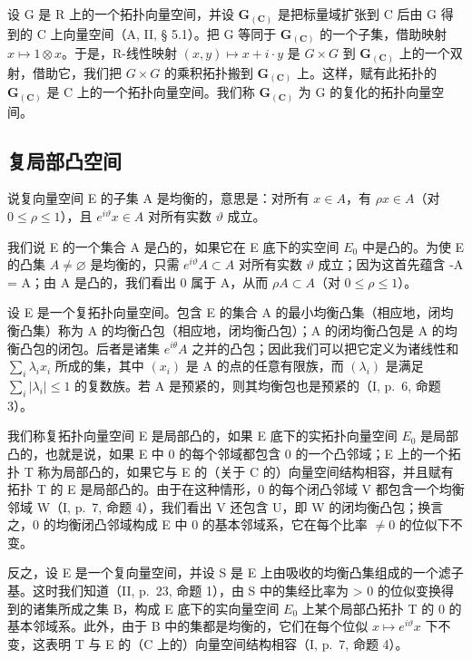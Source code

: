 设 G 是 R 上的一个拓扑向量空间，并设 \(\mathbf{G}_{(\mathbf{C})}\) 是把标量域扩张到 C 后由 G 得到的 C 上向量空间（A, II, § 5.1）。把 G 等同于 \(\mathbf{G}_{(\mathbf{C})}\) 的一个子集，借助映射 \(x \mapsto 1 \otimes x\)。于是，R-线性映射 \((x, y) \mapsto x + i \cdot y\) 是 \(G \times G\) 到 \(\mathbf{G}_{(\mathbf{C})}\) 上的一个双射，借助它，我们把 \(G \times G\) 的乘积拓扑搬到 \(\mathbf{G}_{(\mathbf{C})}\) 上。这样，赋有此拓扑的 \(\mathbf{G}_{(\mathbf{C})}\) 是 C 上的一个拓扑向量空间。我们称 \(\mathbf{G}_{(\mathbf{C})}\) 为 G 的复化的拓扑向量空间。

\subsection{复局部凸空间}

说复向量空间 E 的子集 A 是均衡的，意思是：对所有 \(x \in A\)，有 \(\rho x \in A\)（对 \(0 \leqslant \rho \leqslant 1\)），且 \(e^{i\vartheta}x \in A\) 对所有实数 \(\vartheta\) 成立。

我们说 E 的一个集合 A 是凸的，如果它在 E 底下的实空间 \(E_{0}\) 中是凸的。为使 E 的凸集 \(A \neq \varnothing\) 是均衡的，只需 \(e^{i\vartheta}A \subset A\) 对所有实数 \(\vartheta\) 成立；因为这首先蕴含 -A = A；由 A 是凸的，我们看出 0 属于 A，从而 \(\rho A \subset A\)（对 \(0 \leqslant \rho \leqslant 1\)）。

设 E 是一个复拓扑向量空间。包含 E 的集合 A 的最小均衡凸集（相应地，闭均衡凸集）称为 A 的均衡凸包（相应地，闭均衡凸包）；A 的闭均衡凸包是 A 的均衡凸包的闭包。后者是诸集 \(e^{i\theta}A\) 之并的凸包；因此我们可以把它定义为诸线性和 \(\sum_{i}\lambda_{i}x_{i}\) 所成的集，其中 \((x_{i})\) 是 A 的点的任意有限族，而 \((\lambda_{i})\) 是满足 \(\sum_{i}|\lambda_{i}| \leqslant 1\) 的复数族。若 A 是预紧的，则其均衡包也是预紧的（I, p.~6, 命题 3）。

我们称复拓扑向量空间 E 是局部凸的，如果 E 底下的实拓扑向量空间 \(E_{0}\) 是局部凸的，也就是说，如果 E 中 0 的每个邻域都包含 0 的一个凸邻域；E 上的一个拓扑 T 称为局部凸的，如果它与 E 的（关于 C 的）向量空间结构相容，并且赋有拓扑 T 的 E 是局部凸的。由于在这种情形，0 的每个闭凸邻域 V 都包含一个均衡邻域 W（I, p.~7, 命题 4），我们看出 V 还包含 U，即 W 的闭均衡凸包；换言之，0 的均衡闭凸邻域构成 E 中 0 的基本邻域系，它在每个比率 \(\neq 0\) 的位似下不变。

反之，设 E 是一个复向量空间，并设 S 是 E 上由吸收的均衡凸集组成的一个滤子基。这时我们知道（II, p.~23, 命题 1），由 S 中的集经比率为 \textgreater{} 0 的位似变换得到的诸集所成之集 B，构成 E 底下的实向量空间 \(E_{0}\) 上某个局部凸拓扑 T 的 0 的基本邻域系。此外，由于 B 中的集都是均衡的，它们在每个位似 \(x \mapsto e^{i\vartheta}x\) 下不变，这表明 T 与 E 的（C 上的）向量空间结构相容（I, p.~7, 命题 4）。

